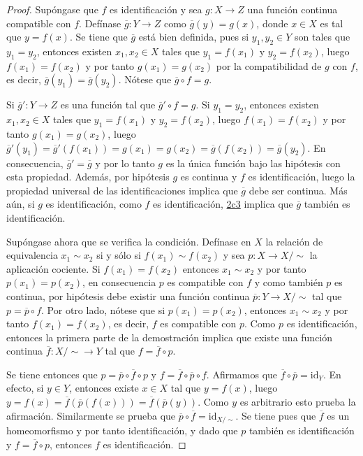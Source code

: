 \begin{proof}
Supóngase que $f$ es identificación y sea $g : X \longrightarrow Z$ una función continua compatible con $f$. Defínase $\overline{g} : Y \longrightarrow Z$ como $\overline{g}(y) = g(x)$, donde $x \in X$ es tal que $y = f(x)$. Se tiene que $\overline{g}$ está bien definida, pues si $y_1, y_2 \in Y$ son tales que $y_1 = y_2$, entonces existen $x_1, x_2 \in X$ tales que $y_1 = f(x_1)$ y $y_2 = f(x_2)$, luego $f(x_1) = f(x_2)$ y por tanto $g(x_1) = g(x_2)$ por la compatibilidad de $g$ con $f$, es decir, $\overline{g}(y_1) = \overline{g}(y_2)$. Nótese que $\overline{g} \circ f = g$.
\bigskip

Si $\overline{g}' : Y \longrightarrow Z$ es una función tal que $\overline{g}' \circ f = g$. Si $y_1 = y_2$, entonces existen $x_1, x_2 \in X$ tales que $y_1 = f(x_1)$ y $y_2 = f(x_2)$, luego $f(x_1) = f(x_2)$ y por tanto $g(x_1) = g(x_2)$, luego $\overline{g}'(y_1) = \overline{g}'(f(x_1)) = g(x_1) = g(x_2) = \overline{g}(f(x_2)) = \overline{g}(y_2)$. En consecuencia, $\overline{g}' = \overline{g}$ y por lo tanto $g$ es la única función bajo las hipótesis con esta propiedad. Además, por hipótesis $g$ es continua y $f$ es identificación, luego la propiedad universal de las identificaciones implica que $\overline{g}$ debe ser continua. Más aún, si $g$ es identificación, como $f$ es identificación, \hyperref[card:2c3]{\textsf{2c3}} implica que $\overline{g}$ también es identificación.
\bigskip

Supóngase ahora que se verifica la condición. Defínase en $X$ la relación de equivalencia $x_1 \sim x_2$ si y sólo si $f(x_1) \sim f(x_2)$ y sea $p : X \longrightarrow X/\sim$ la aplicación cociente. Si $f(x_1) = f(x_2)$ entonces $x_1 \sim x_2$ y por tanto $p(x_1) = p(x_2)$, en consecuencia $p$ es compatible con $f$ y como también $p$ es continua, por hipótesis debe existir una función continua $\overline{p} : Y \longrightarrow X/\sim$ tal que $p = \overline{p} \circ f$. Por otro lado, nótese que si $p(x_1) = p(x_2)$, entonces $x_1 \sim x_2$ y por tanto $f(x_1) = f(x_2)$, es decir, $f$ es compatible con $p$. Como $p$ es identificación, entonces la primera parte de la demostración implica que existe una función continua $\overline{f} : X/\sim \longrightarrow Y$ tal que $f = \overline{f} \circ p$.
\bigskip

Se tiene entonces que $p = \overline{p} \circ \overline{f} \circ p$ y $f = \overline{f} \circ \overline{p} \circ f$. Afirmamos que $\overline{f} \circ \overline{p} = \text{id}_Y$. En efecto, si $y \in Y$, entonces existe $x \in X$ tal que $y = f(x)$, luego $y = f(x) = \overline{f}(\overline{p}(f(x))) = \overline{f}(\overline{p}(y))$. Como $y$ es arbitrario esto prueba la afirmación. Similarmente se prueba que $\overline{p} \circ \overline{f} = \text{id}_{X/\sim}$. Se tiene pues que $\overline{f}$ es un homeomorfismo y por tanto identificación, y dado que $p$ también es identificación y $f = \overline{f} \circ p$, entonces $f$ es identificación.
\end{proof}
